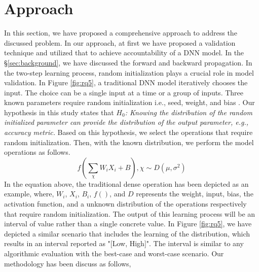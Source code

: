 \section{Approach}
\label{sec:approach}
In this section, we have proposed a comprehensive approach to address the discussed problem. In our approach, at first we have proposed a validation technique and utilized that to achieve accountability of a DNN model. In the \S\ref{sec:background}, we have discussed the forward and backward propagation. In the two-step learning process, random initialization plays a crucial role in model validation. In Figure \ref{fig:rq5}, a traditional DNN model iteratively chooses the input. The choice can be a single input at a time or a group of inputs. Three known parameters require random initialization i.e., seed, weight, and bias \cite{sutskever2013importance}. Our hypothesis in this study states that \emph{$H_0$: Knowing the distribution of the random initialized parameter can provide the distribution of the output parameter, e.g., accuracy metric.} Based on this hypothesis, we select the operations that require random initialization. Then, with the known distribution, we perform the model operations as follows.
\begin{equation}
f(\sum_{\chi}{W_iX_i+B}), \chi\sim D(\mu, \sigma^2)
\end{equation}
In the equation above, the traditional dense operation has been depicted as an example, where, $W_i$, $X_i$, $B_i$, $f()$, and $D$ represents the weight, input, bias, the activation function, and a unknown distribution of the operations respectively that require random initialization. The output of this learning process will be an interval of value rather than a single concrete value. In Figure \ref{fig:rq5}, we have depicted a similar scenario that includes the learning of the distribution, which results in an interval reported as "[Low, High]". The interval is similar to any algorithmic evaluation with the best-case and worst-case scenario. 
Our methodology has been discuss as follows,
